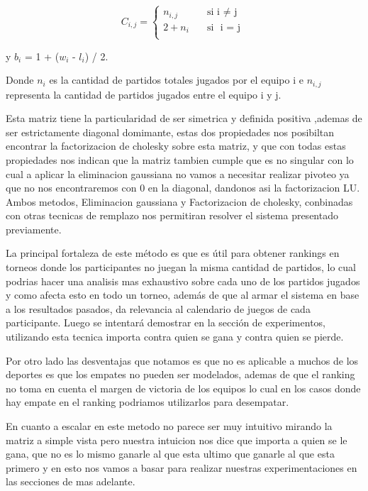 \[ C_{i,j} =
    \begin{cases}
        n_{i,j}       & \quad \text{si }  \text{i $\neq$ j}\\
        2+n_i & \quad \text{si } \text{ i = j }\\
    \end{cases}

    \]
                    
y $b_i$ = 1 +  ($w_i$ - $l_i$) / 2.

Donde $n_i$ es la cantidad de partidos totales jugados por el equipo i e $n_{i,j}$ representa la cantidad de partidos jugados entre el equipo i y j.

Esta matriz tiene la particularidad de ser simetrica y definida positiva ,ademas de ser estrictamente diagonal domimante, estas dos propiedades nos 
posibiltan encontrar la factorizacion de cholesky sobre esta matriz, y que con todas estas propiedades nos indican que la matriz tambien cumple que es no singular 
con lo cual a aplicar la eliminacion gaussiana no vamos a necesitar realizar pivoteo ya que no nos encontraremos con 0 en la diagonal, dandonos asi la factorizacion LU.
Ambos metodos, Eliminacion gaussiana y Factorizacion de cholesky, conbinadas con otras tecnicas de remplazo nos permitiran resolver el sistema presentado previamente.

La principal fortaleza de este método es que es útil para obtener rankings en torneos donde los participantes no juegan la misma cantidad de partidos, lo cual 
podrias hacer una analisis mas exhaustivo sobre cada uno de los partidos jugados y como afecta esto en todo un torneo,
además de que al armar el sistema en base a los resultados pasados, da relevancia al calendario de juegos de cada participante. 
Luego se intentará demostrar en la sección de experimentos, utilizando esta tecnica importa contra quien se gana y contra quien se pierde.

Por otro lado las desventajas que notamos es que no es aplicable a muchos de los deportes es que los empates no pueden ser modelados, ademas de que el ranking no toma en cuenta
el margen de victoria de los equipos lo cual en los casos donde hay empate en el ranking podriamos utilizarlos para desempatar.

En cuanto a escalar en este metodo no parece ser muy intuitivo mirando la matriz a simple vista pero nuestra intuicion nos dice que importa a quien se le gana, que no es lo mismo ganarle al que esta ultimo que ganarle al que esta primero
y en esto nos vamos a basar para realizar nuestras experimentaciones en las secciones de mas adelante.

